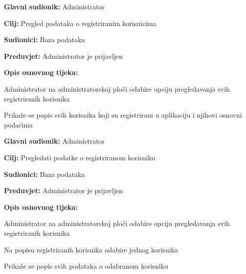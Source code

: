 \noindent {}
\begin{packed_item}
	
	\item \textbf{Glavni sudionik:} Administrator
	\item  \textbf{Cilj:} Pregled podataka o registriranim korisnicima
	\item  \textbf{Sudionici:} Baza podataka
	\item  \textbf{Preduvjet:} Administrator je prijavljen
	\item  \textbf{Opis osnovnog tijeka:}
	
	\item[] \begin{packed_enum}
		
		\item Administrator na administratorskoj ploči odabire opciju pregledavanja svih registriranih korisnika 
		\item Prikaže se popis svih korisnika koji su registrirani u aplikaciju i njihovi osnovni podacima

	\end{packed_enum}
\end{packed_item}

\noindent {}
\begin{packed_item}
	
	\item \textbf{Glavni sudionik:} Administrator
	\item  \textbf{Cilj:} Pregledati podatke o registriranom korisniku
	\item  \textbf{Sudionici:} Baza podataka
	\item  \textbf{Preduvjet:} Administrator je prijavljen
	\item  \textbf{Opis osnovnog tijeka:}
	
	\item[] \begin{packed_enum}

		\item Administrator na administratorskoj ploči odabire opciju pregledavanja svih registriranih korisnika 
		\item Na popisu registriranih korisnika odabire jednog korisnika
		\item Prikaže se popis svih podataka o odabranom korisniku

	\end{packed_enum}
\end{packed_item}

